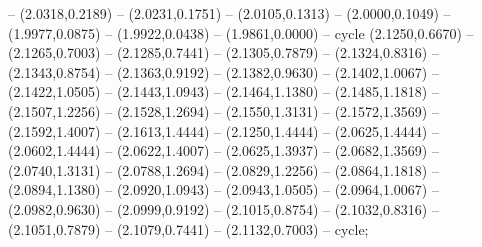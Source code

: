 {-- (2.0318,0.2189) -- (2.0231,0.1751) -- (2.0105,0.1313) -- (2.0000,0.1049) -- (1.9977,0.0875) -- (1.9922,0.0438) -- (1.9861,0.0000) -- cycle (2.1250,0.6670) -- (2.1265,0.7003) -- (2.1285,0.7441) -- (2.1305,0.7879) -- (2.1324,0.8316) -- (2.1343,0.8754) -- (2.1363,0.9192) -- (2.1382,0.9630) -- (2.1402,1.0067) -- (2.1422,1.0505) -- (2.1443,1.0943) -- (2.1464,1.1380) -- (2.1485,1.1818) -- (2.1507,1.2256) -- (2.1528,1.2694) -- (2.1550,1.3131) -- (2.1572,1.3569) -- (2.1592,1.4007) -- (2.1613,1.4444) -- (2.1250,1.4444) -- (2.0625,1.4444) -- (2.0602,1.4444) -- (2.0622,1.4007) -- (2.0625,1.3937) -- (2.0682,1.3569) -- (2.0740,1.3131) -- (2.0788,1.2694) -- (2.0829,1.2256) -- (2.0864,1.1818) -- (2.0894,1.1380) -- (2.0920,1.0943) -- (2.0943,1.0505) -- (2.0964,1.0067) -- (2.0982,0.9630) -- (2.0999,0.9192) -- (2.1015,0.8754) -- (2.1032,0.8316) -- (2.1051,0.7879) -- (2.1079,0.7441) -- (2.1132,0.7003) -- cycle;
}
